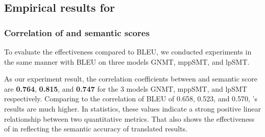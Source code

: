 \subsection{Empirical results for {\model}}
\subsubsection{Correlation of {\model} and semantic scores}
To evaluate the effectiveness {\model} compared to BLEU, we conducted experiments 
in the same manner with BLEU on three models GNMT, mppSMT, and lpSMT. 

%

As our experiment result, the correlation coefficients between {\model} and
semantic score are \textbf{0.764}, \textbf{0.815}, and \textbf{0.747} for the 
3 models GNMT, mppSMT, and lpSMT  respectively. Comparing to the correlation 
of BLEU of 0.658, 0.523, and 0.570, {\model}'s results are much higher. 
In statistics, these values indicate a strong positive linear relationship between two 
quantitative metrics. That also shows the effectiveness of {\model} in reflecting the 
semantic accuracy of translated results.



